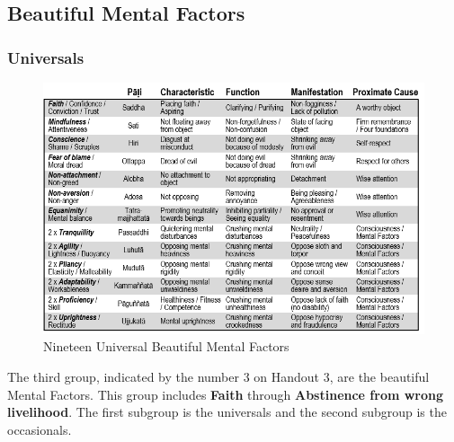 \subsection*{Beautiful Mental Factors}

\subsubsection*{Universals}

\begin{figure}[h]
\centering
\includegraphics[width=0.8\linewidth]{./Diagrams/U-W}
\caption{Nineteen Universal Beautiful Mental Factors}
\label{fig:U-W}
\end{figure}

The third group, indicated by the number 3 on Handout 3, are the beautiful Mental Factors. This group includes \textbf{Faith} through \textbf{Abstinence from wrong livelihood}. The first subgroup is the universals and the second subgroup is the occasionals.

